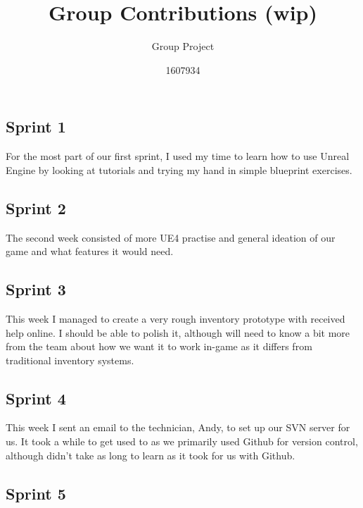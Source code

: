 \documentclass{scrartcl}
\title{Group Contributions (wip)}
\subtitle{Group Project}
\author{1607934}
\begin{document}
\maketitle


\newpage
\clearpage

\section*{}


\subsection*{Sprint 1}

For the most part of our first sprint, I used my time to learn how to use Unreal Engine by looking at tutorials and trying my hand in simple blueprint exercises. 

\subsection*{Sprint 2}

The second week consisted of more UE4 practise and general ideation of our game and what features it would need.

\subsection*{Sprint 3}

This week I managed to create a very rough inventory prototype with received help online. I should be able to polish it, although will need to know a bit more from the team about how we want it to work in-game as it differs from traditional inventory systems.

\subsection*{Sprint 4}

This week I sent an email to the technician, Andy, to set up our SVN server for us. It took a while to get used to as we primarily used Github for version control, although didn't take as long to learn as it took for us with Github.

\subsection*{Sprint 5}
\end{document}
